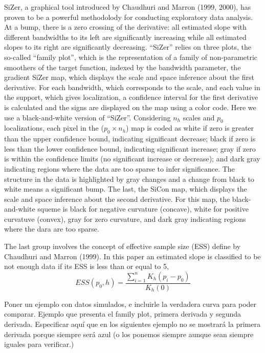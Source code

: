 \documentclass[preprint,12pt]{elsarticle}
\begin{document}
\noindent SiZer, a graphical tool introduced by Chaudhuri and Marron (1999, 2000), has proven to be a powerful methodolody for conducting exploratory data analysis. At a bump, there is a zero crossing of the derivative: all estimated slope with different bandwidths to its left are significantly increasing while all estimated slopes to its right are significantly decreasing. ``SiZer'' relies on three plots, the so-called ``family plot'', which is the representation of a family of non-parametric smoothers of the target function, indexed by the bandwidth parameter, the gradient SiZer map, which displays the scale and space inference about the first derivative. For each bandwidth, which corresponds to the scale,  and each value in the support, which gives localization, a confidence interval for the first derivative is calculated and the signs are displayed on the map using a color code. Here we use a black-and-white version of ``SiZer''. Considering $n_h$ scales and $p_0$ localizations, each pixel in the ($p_0 \times n_h$) map is coded as white if zero is greater than the upper confidence bound, indicating significant decrease;  black  if zero is less than the lower confidence bound, indicating significant increase; gray  if zero is within the confidence limits (no significant increase or decrease); and dark gray indicating regions where the data are too sparse to infer significance. The structure in the data is highlighted by gray changes and a change from black to white  means a significant bump. The last, the SiCon map, which displays the scale and space inference about the second derivative. For this map, the black-and-white squeme is black for negative curvature (concave), white for positive curvatuve (convex), gray for zero curvature, and dark gray indicating regions where the dara are too sparse.

The last group involves the concept of effective sample size (ESS) define by Chaudhuri and Marron (1999). In this paper an estimated slope is classified to be not enough data if its ESS is less than or equal to 5, 
$$
ESS(p_0,h) = \frac{\sum_{i=1}^n K_h(p_i-p_0)}{K_h(0)}
$$


Poner un ejemplo con datos simulados, e incluirle la verdadera curva para poder comparar.  Ejemplo que presenta el family plot, primera derivada y segunda derivada. Especificar aquí que en los siguientes ejemplo no se mostrará la primera derivada porque siempre será azul (o los ponemos siempre aunque sean siempre iguales para verificar.)
 
\end{document}
